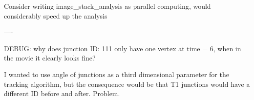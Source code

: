 \documentclass[a4paper,10pt]{article}
\begin{document}
Consider writing image_stack_analysis as parallel computing, would considerably speed up the analysis

----


DEBUG: why does junction ID: 111 only have one vertex at time = 6, when in the movie it clearly looks fine?

I wanted to use angle of junctions as a third dimensional parameter for the tracking algorithm, but the consequence would be that T1 junctions would have a different ID before and after. Problem.
\end{document}
